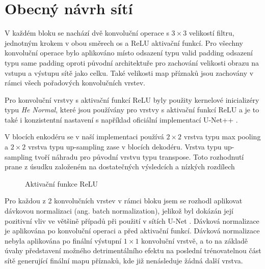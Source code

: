 \section{Obecný návrh sítí}
\label{sec:Chapter42}
V každém bloku se nachází dvě konvoluční operace s $3\times3$ velikostí filtru, jednotným krokem v obou směrech os a ReLU aktivační funkcí. Pro všechny konvoluční operace bylo aplikováno místo odsazení typu valid padding odsazení typu same padding oproti původní architektuře \cite{unet} pro zachování velikosti obrazu na vstupu a výstupu sítě jako celku. Také velikosti map příznaků jsou zachovány v rámci všech pořadových konvolučních vrstev. 

Pro konvoluční vrstvy s aktivační funkcí ReLU byly použity kernelové inicializéry typu \textit{He Normal}, které jsou používány pro vrstvy s aktivační funkcí ReLU \cite{relu_henormal} a je to také i konzistentní nastavení s například oficiální implementací U-Net++ \cite{unetpp_github}. 

V blocích enkodéru se v naší implementaci používá $2\times2$ vrstva typu max pooling a $2\times2$ vrstva typu up-sampling zase v blocích dekodéru. Vrstva typu up-sampling tvoří náhradu pro původní vrstvu typu transpose. Toto rozhodnutí prane z úsudku založeném na dostatečných výsledcích a nízkých rozdílech 

\begin{figure}[ht]
    \centering
    \caption[Aktivační funkce ReLU]{Aktivační funkce ReLU}
    \label{fig:relu}
\end{figure}

Pro každou z 2 konvolučních vrstev v rámci bloku jsem se rozhodl aplikovat dávkovou normalizaci (ang. batch normalization), jelikož byl dokázán její pozitivní vliv ve většině případů při použití v sítích U-Net \cite{unetnormalization}. Dávková normalizace je aplikována po konvoluční operaci a před aktivační funkcí. Dávková normalizace nebyla aplikována po finální výstupní $1\times1$ konvoluční vrstvě, a to na základě úvahy představení možného detrimentálního efektu na poslední trénovatelnou část sítě generující finální mapu příznaků, kde již nenásleduje žádná další vrstva.

